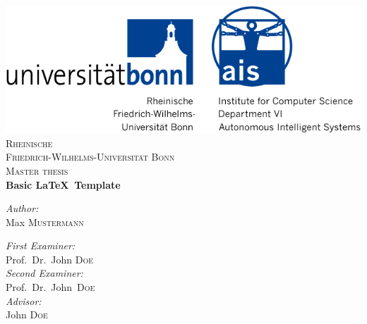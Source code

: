 \documentclass[12pt, %
a4paper, %
twoside, %
openright, %
abstract=on, %
DIV=11,      %
BCOR=8mm]{scrbook} %
\begin{document}
    \frontmatter

    \begin{titlepage}
        \begin{center}

            \includegraphics{img/logo2}\\[1cm]

            \textsc{\LARGE Rheinische\\[5mm] Friedrich-Wilhelms-Universität Bonn}\\[1.5cm]

            \textsc{\Large Master thesis}\\[1.5cm]

            { \Large \bfseries Basic \LaTeX \, Template }\\[1.4cm]

            \begin{minipage}[t]{0.4\textwidth}
                \begin{flushleft} \large
                    \emph{Author:}\\
                    Max \textsc{Mustermann}
                \end{flushleft}
            \end{minipage}
            \begin{minipage}[t]{0.5\textwidth}
                \begin{flushright} \large
                    \emph{First Examiner:} \\
                    Prof.~Dr.~John \textsc{Doe} \\[0.5cm]
                    \emph{Second Examiner:} \\
                    Prof.~Dr.~John~\textsc{Doe} \\[0.5cm]

                    \emph{Advisor:} \\
                    John \textsc{Doe} \\[0.5cm]
                \end{flushright}
            \end{minipage}


\end{center}
\end{titlepage}
\end{document}
